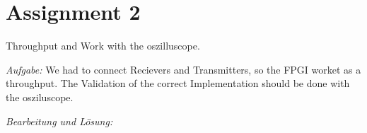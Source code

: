 \section*{Assignment 2}
Throughput and Work with the oszilluscope.

\emph{Aufgabe: } We had to connect Recievers and Transmitters, so the FPGI worket as a throughput. The Validation of the correct Implementation should be done with the osziluscope.

\emph{Bearbeitung und Lösung: }
